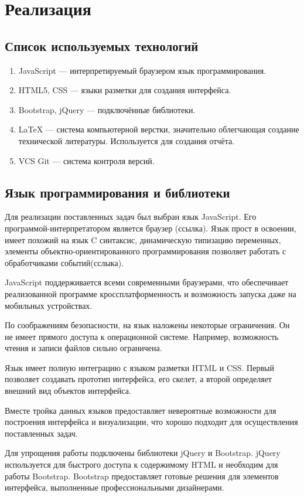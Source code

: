 \section{Реализация}
\subsection{Список используемых технологий}
\begin{enumerate}
\item JavaScript — интерпретируемый браузером язык программирования.
\item HTML5, CSS — языки разметки для создания интерфейса.
\item Bootstrap, jQuery — подключённые библиотеки.
\item LaTeX — система компьютерной верстки, значительно облегчающая создание технической литературы. Используется для создания отчёта.
\item VCS Git — система контроля версий.
\end{enumerate}
\subsection{Язык программирования и библиотеки}
Для реализации поставленных задач был выбран язык JavaScript. Его программой-интерпретатором является браузер (ссылка). Язык прост в освоении, имеет похожий на язык C синтаксис, динамическую типизацию переменных, элементы объектно-ориентированного программирования позволяет работать с обработчиками событий(сслыка).

JavaScript поддерживается всеми современными браузерами, что обеспечивает реализованной программе кроссплатформенность и возможность запуска даже на мобильных устройствах.

По соображениям безопасности, на язык наложены некоторые ограничения. Он не имеет прямого доступа к операционной системе. Например, возможность чтения и записи файлов сильно ограничена.

Язык имеет полную интеграцию с языком разметки HTML и CSS. Первый позволяет создавать прототип интерфейса, его скелет, а второй определяет внешний вид объектов интерфейса.

Вместе тройка данных языков предоставляет невероятные возможности для построения интерфейса и визуализации, что хорошо подходит для осуществления поставленных задач.

Для упрощения работы подключены библиотеки jQuery и Bootstrap. jQuery используется для быстрого доступа к содержимому HTML и необходим для работы Bootstrap. Bootstrap предоставляет готовые решения для элементов интерфейса, выполненные профессиональными дизайнерами. 

